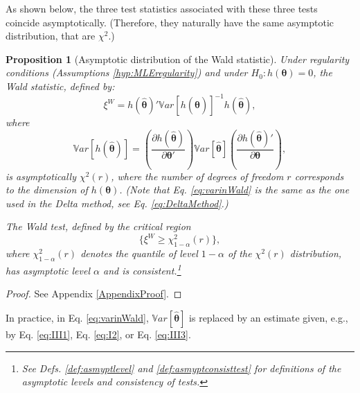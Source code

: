 \documentclass[
  12pt,
]{book}
\newtheorem{proposition}{Proposition}[chapter]
\theoremstyle{definition}
\theoremstyle{definition}
\theoremstyle{definition}
\theoremstyle{definition}
\theoremstyle{remark}
\begin{document}
As shown below, the three test statistics associated with these three tests coincide asymptotically. (Therefore, they naturally have the same asymptotic distribution, that are \(\chi^2\).)

\begin{proposition}[Asymptotic distribution of the Wald statistic]
\protect\hypertarget{prp:Walddistri}{}\label{prp:Walddistri}Under regularity conditions (Assumptions \ref{hyp:MLEregularity}) and under \(H_0: h(\boldsymbol\theta)=0\), the Wald statistic, defined by:
\[
\boxed{\xi^W = h(\hat{\boldsymbol\theta})' \mathbb{V}ar[h(\hat{\boldsymbol\theta})]^{-1} h(\hat{\boldsymbol\theta}),}
\]
where
\begin{equation}
\mathbb{V}ar[h(\hat{\boldsymbol\theta})] = \left(\frac{\partial h(\hat{\boldsymbol\theta})}{\partial \boldsymbol\theta'} \right) \mathbb{V}ar[\hat{\boldsymbol\theta}]
\left(\frac{\partial h(\hat{\boldsymbol\theta})'}{\partial \boldsymbol\theta} \right),\label{eq:varinWald}
\end{equation}
is asymptotically \(\chi^2(r)\), where the number of degrees of freedom \(r\) corresponds to the dimension of \(h(\boldsymbol\theta)\). (Note that Eq. \eqref{eq:varinWald} is the same as the one used in the Delta method, see Eq. \eqref{eq:DeltaMethod}.)

The Wald test, defined by the critical region
\[
\{\xi^W \ge \chi^2_{1-\alpha}(r)\},
\]
where \(\chi^2_{1-\alpha}(r)\) denotes the quantile of level \(1-\alpha\) of the \(\chi^2(r)\) distribution, has asymptotic level \(\alpha\) and is consistent.\footnote{See Defs. \ref{def:asmyptlevel} and \ref{def:asmyptconsisttest} for definitions of the asymptotic levels and consistency of tests.}
\end{proposition}

\begin{proof}
See Appendix \ref{AppendixProof}.
\end{proof}

In practice, in Eq. \eqref{eq:varinWald}, \(\mathbb{V}ar[\hat{\boldsymbol\theta}]\) is replaced by an estimate given, e.g., by Eq. \eqref{eq:III1}, Eq. \eqref{eq:I2}, or Eq. \eqref{eq:III3}.
\end{document}
